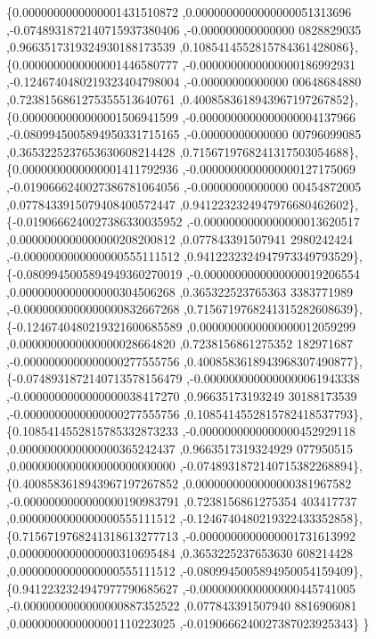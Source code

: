 \begin{DoxyCode}
\{0.0000000000000001431510872 ,0.0000000000000000051313696 ,-0.0748931872140715937380406 ,-0.000000000000000
      0828829035 ,0.9663517319324930188173539 ,0.1085414552815784361428086\},
\{0.0000000000000001446580777 ,-0.0000000000000000186992931 ,-0.1246740480219323404798004 ,-0.00000000000000
      00648684880 ,0.7238156861275355513640761 ,0.4008583618943967197267852\},
\{0.0000000000000001506941599 ,-0.0000000000000000004137966 ,-0.0809945005894950331715165 ,-0.00000000000000
      00796099085 ,0.3653225237653630608214428 ,0.7156719768241317503054688\},
\{0.0000000000000001411792936 ,-0.0000000000000000127175069 ,-0.0190666240027386781064056 ,-0.00000000000000
      00454872005 ,0.0778433915079408400572447 ,0.9412232324947976680462602\},
\{-0.0190666240027386330035952 ,-0.0000000000000000013620517 ,0.0000000000000000208200812 ,0.077843391507941
      2980242424 ,-0.0000000000000000555111512 ,0.9412232324947973349793529\},
\{-0.0809945005894949360270019 ,-0.0000000000000000019206554 ,0.0000000000000000304506268 ,0.365322523765363
      3383771989 ,-0.0000000000000000832667268 ,0.7156719768241315282608639\},
\{-0.1246740480219321600685589 ,0.0000000000000000012059299 ,0.0000000000000000028664820 ,0.7238156861275352
      182971687 ,-0.0000000000000000277555756 ,0.4008583618943968307490877\},
\{-0.0748931872140713578156479 ,-0.0000000000000000061943338 ,-0.0000000000000000038417270 ,0.96635173193249
      30188173539 ,-0.0000000000000000277555756 ,0.1085414552815782418537793\},
\{0.1085414552815785332873233 ,-0.0000000000000000452929118 ,0.0000000000000000365242437 ,0.9663517319324929
      077950515 ,0.0000000000000000000000000 ,-0.0748931872140715382268894\},
\{0.4008583618943967197267852 ,0.0000000000000000381967582 ,-0.0000000000000000190983791 ,0.7238156861275354
      403417737 ,0.0000000000000000555111512 ,-0.1246740480219322433352858\},
\{0.7156719768241318613277713 ,-0.0000000000000001731613992 ,0.0000000000000000310695484 ,0.3653225237653630
      608214428 ,0.0000000000000000555111512 ,-0.0809945005894950054159409\},
\{0.9412232324947977790685627 ,-0.0000000000000000445741005 ,-0.0000000000000000887352522 ,0.077843391507940
      8816906081 ,0.0000000000000001110223025 ,-0.0190666240027387023925343\}
\}
\end{DoxyCode}
\mbox{\label{a00449_a8f4f56c14261cc0dbe3d7d7856f58be7}} 

